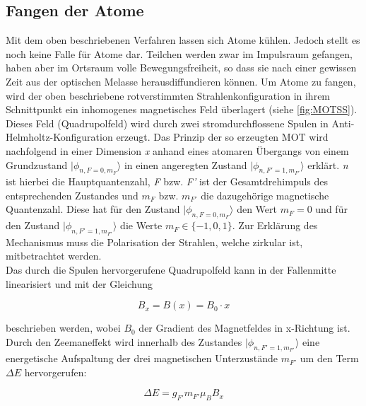 \documentclass[
class=book,
accentcolor=1b,
custommargins=geometry,
fontsize=11pt,
thesis={type=Versuchsanleitung},
ruledheaders=all,
headline=false,
instbox=false,
marginpar=false,
title=small,
ignore-missing-data=true,
twoside=false,
logofile=apqdesign/tuda_logo.pdf,
pdfa=false %
]{apqpub}
\begin{document}
				\subsection{Fangen der Atome}
				
				Mit dem oben beschriebenen Verfahren lassen sich Atome kühlen. Jedoch stellt es noch keine Falle für Atome dar. Teilchen werden zwar im Impulsraum gefangen, haben aber im Ortsraum volle Bewegungsfreiheit, so dass sie nach einer gewissen Zeit aus der optischen Melasse herausdiffundieren können. Um Atome zu fangen, wird der oben beschriebene rotverstimmten Strahlenkonfiguration in ihrem Schnittpunkt ein inhomogenes magnetisches Feld überlagert (siehe \autoref{fig:MOTSS}). Dieses Feld (Quadrupolfeld) wird durch zwei stromdurchflossene Spulen in Anti-Helmholtz-Konfiguration erzeugt. Das Prinzip der so erzeugten MOT wird nachfolgend in einer Dimension \textit{x} anhand eines atomaren Übergangs von einem Grundzustand $\lvert \phi_{n,F=0,m_F}\rangle$ in einen angeregten Zustand $\lvert \phi_{n,F'=1,m_{F'}}\rangle$ erklärt.
				\textit{n} ist hierbei die Hauptquantenzahl, \textit{F} bzw. \textit{F'} ist der Gesamtdrehimpuls des entsprechenden Zustandes und $m_F$ bzw. $m_{F'}$ die dazugehörige magnetische Quantenzahl. Diese hat für den Zustand $\lvert \phi_{n,F=0,m_F}\rangle$ den Wert $m_F=0$ und für den Zustand $\lvert \phi_{n,F'=1,m_{F'}}\rangle$ die Werte $m_F \in \{-1,0,1\}$. Zur Erklärung des Mechanismus muss die Polarisation der Strahlen, welche zirkular ist, mitbetrachtet werden.\\
				Das durch die Spulen hervorgerufene Quadrupolfeld kann in der Fallenmitte linearisiert und mit der Gleichung
				
				\begin{equation}
				B_x = B(x) = B_0 \cdot x
				\end{equation}
				
				beschrieben werden, wobei $B_0$ der Gradient des Magnetfeldes in x-Richtung ist. Durch den Zeemaneffekt wird innerhalb des Zustandes $\lvert \phi_{n,F'=1,m_{F'}}\rangle$ eine energetische Aufspaltung der drei magnetischen Unterzustände $m_{F'}$ um den Term $\varDelta E$ hervorgerufen:
				
				\begin{equation}
				\varDelta E = g_{F'} m_{F'} \mu_B B_x
				\end{equation}
				
\end{document}
